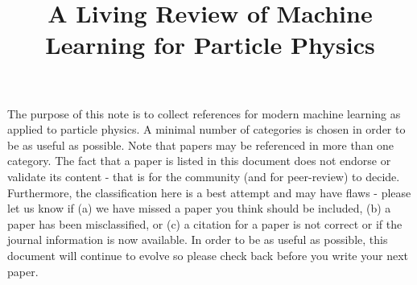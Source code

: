 \documentclass[12pt,letterpaper]{article}
\title{\boldmath A Living Review of Machine \\ Learning for Particle Physics}
\begin{document}
\maketitle

The purpose of this note is to collect references for modern machine learning as applied to particle physics.  A minimal number of categories is chosen in order to be as useful as possible.  Note that papers may be referenced in more than one category.  The fact that a paper is listed in this document does not endorse or validate its content - that is for the community (and for peer-review) to decide.  Furthermore, the classification here is a best attempt and may have flaws - please let us know if (a) we have missed a paper you think should be included, (b) a paper has been misclassified, or (c) a citation for a paper is not correct or if the journal information is now available.  In order to be as useful as possible, this document will continue to evolve so please check back before you write your next paper.
\end{document}
